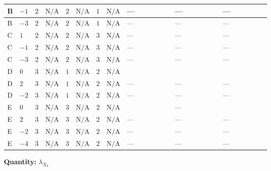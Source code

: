 \documentclass[8pt]{article}
\begin{document}
\begin{landscape}
\begin{longtable}{@{}llcccccc >{\raggedright\arraybackslash}p{0.21\linewidth} >{\raggedright\arraybackslash}p{0.21\linewidth} >{\raggedright\arraybackslash}p{0.21\linewidth}@{}}
\midrule
B & $-1$ & $2$ & $\text{N/A}$ & $2$ & $\text{N/A}$ & $1$ & $\text{N/A}$ & --- & --- & --- \\
\midrule
B & $-3$ & $2$ & $\text{N/A}$ & $2$ & $\text{N/A}$ & $1$ & $\text{N/A}$ & --- & --- & --- \\
\midrule
C & $1$ & $2$ & $\text{N/A}$ & $2$ & $\text{N/A}$ & $3$ & $\text{N/A}$ & --- & --- & --- \\
\midrule
C & $-1$ & $2$ & $\text{N/A}$ & $2$ & $\text{N/A}$ & $3$ & $\text{N/A}$ & --- & --- & --- \\
\midrule
C & $-3$ & $2$ & $\text{N/A}$ & $2$ & $\text{N/A}$ & $3$ & $\text{N/A}$ & --- & --- & --- \\
\midrule
D & $0$ & $3$ & $\text{N/A}$ & $1$ & $\text{N/A}$ & $2$ & $\text{N/A}$ & \scriptsize\adjustbox{max width=\linewidth}{$\begin{gathered} 88 {\lambda_{X_{6}}} \left({\lambda_{X_{9}}}\right)^{*}\end{gathered}$} & \scriptsize\adjustbox{max width=\linewidth}{$\begin{gathered} +2 {\lambda_{12}^{(1)}} {\lambda_{X_{5}}^{(1)}}\end{gathered}$} & \scriptsize\adjustbox{max width=\linewidth}{$\begin{gathered} +4 {\lambda_{HS_1}^{(1)}} {\lambda_{X_{18}}}\end{gathered}$} \\
\midrule
D & $2$ & $3$ & $\text{N/A}$ & $1$ & $\text{N/A}$ & $2$ & $\text{N/A}$ & --- & --- & --- \\
\midrule
D & $-2$ & $3$ & $\text{N/A}$ & $1$ & $\text{N/A}$ & $2$ & $\text{N/A}$ & --- & --- & --- \\
\midrule
E & $0$ & $3$ & $\text{N/A}$ & $3$ & $\text{N/A}$ & $2$ & $\text{N/A}$ & \scriptsize\adjustbox{max width=\linewidth}{$\begin{gathered} 88 {\lambda_{X_{6}}} \left({\lambda_{X_{9}}}\right)^{*}\end{gathered}$} & --- & \scriptsize\adjustbox{max width=\linewidth}{$\begin{gathered} +4 {\lambda_{HS_1}^{(1)}} {\lambda_{X_{18}}}\end{gathered}$} \\
\midrule
E & $2$ & $3$ & $\text{N/A}$ & $3$ & $\text{N/A}$ & $2$ & $\text{N/A}$ & --- & --- & --- \\
\midrule
E & $-2$ & $3$ & $\text{N/A}$ & $3$ & $\text{N/A}$ & $2$ & $\text{N/A}$ & --- & --- & --- \\
\midrule
E & $-4$ & $3$ & $\text{N/A}$ & $3$ & $\text{N/A}$ & $2$ & $\text{N/A}$ & --- & --- & --- \\
\midrule
\bottomrule
\end{longtable}
\clearpage
\noindent\textbf{Quantity: }${\lambda_{X_{9}}}$\par\smallskip

\end{landscape}
\end{document}
